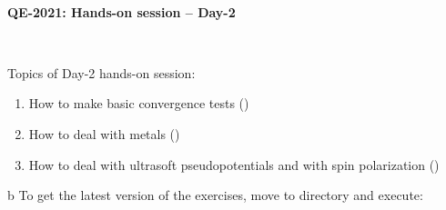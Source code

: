 \documentclass[landscape]{foils}
\begin{document}

\blue
~\\
\vspace*{4cm}
\MyLogo{~}
\vspace{5em}
\begin{center}
  \centerline{\burgundy\LARGE\bf QE-2021: Hands-on session -- Day-2}
  ~\\[1.5em]
\end{center}

Topics of Day-2 hands-on session:
\begin{enumerate}
\item How to make basic convergence tests ()
\item How to deal with metals ()
\item How to deal with ultrasoft pseudopotentials and with spin polarization
  ()
\end{enumerate}
b
To get the latest version of the exercises, move to  directory and execute:\\[0.5em]
    
\end{document}
